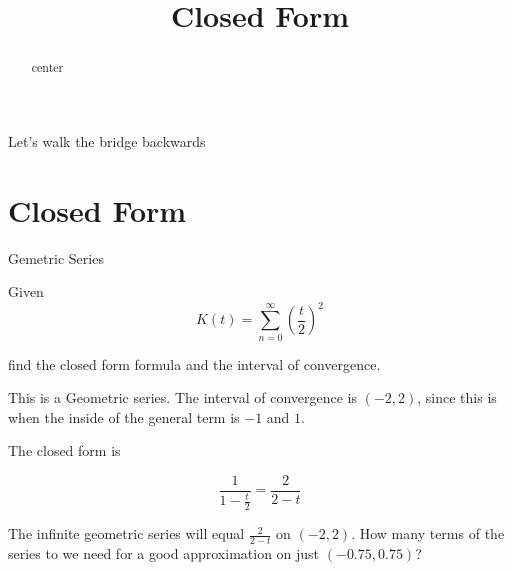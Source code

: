 \documentclass{ximera}
\title{Closed Form}
\begin{document}
\begin{abstract}
center
\end{abstract}
\maketitle






Let's walk the bridge backwards



\section{Closed Form}



\begin{example} Gemetric Series


Given 
\[    K(t) =   \sum_{n=0}^{\infty}  \left( \frac{t}{2} \right)^2\]

find the closed form formula and the interval of convergence.




\begin{explanation}


This is a Geometric series.  The interval of convergence is $(-2, 2)$, since this is when the inside of the general term is $-1$ and $1$.


The closed form is

\[  \frac{1}{1 - \frac{t}{2}}  =     \frac{2}{2-t}           \]



\end{explanation}


\end{example}




The infinite geometric series will equal $\frac{2}{2-t}$ on $(-2, 2)$.  How many terms of the series to we need for a good approximation on just $(-0.75, 0.75)$?



\begin{center}
\end{center}
\end{document}
